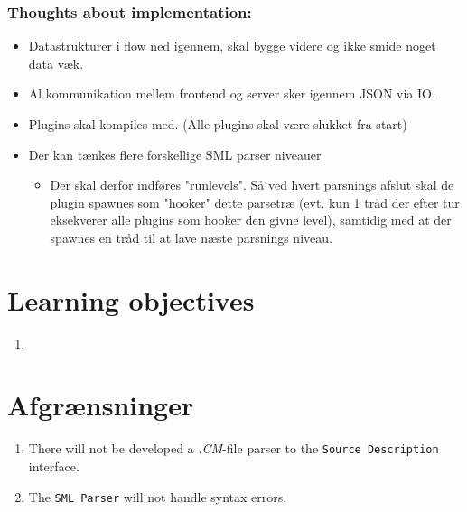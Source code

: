 \documentclass[a4paper,oneside]{memoir}
\begin{document}
\subsubsection{Thoughts about implementation:}
\begin{itemize}
\item Datastrukturer i flow ned igennem, skal bygge videre og ikke smide noget
  data væk.

\item Al kommunikation mellem frontend og server sker igennem JSON via IO.

\item Plugins skal kompiles med. (Alle plugins skal være slukket fra start)


\item Der kan tænkes flere forskellige SML parser niveauer
  \begin{itemize}

  \item Der skal derfor indføres "runlevels". Så ved hvert parsnings
    afslut skal de plugin spawnes som "hooker" dette parsetræ
    (evt. kun 1 tråd der efter tur eksekverer alle plugins som hooker
    den givne level), samtidig med at der spawnes en tråd til at lave
    næste parsnings niveau.
  \end{itemize}
\end{itemize}

\section{Learning objectives}

\begin{enumerate}
\item
\end{enumerate}

\section{Afgrænsninger}

\begin{enumerate}
\item There will not be developed a \textit{.CM}-file parser to the
  \texttt{Source Description} interface.

\item The \texttt{SML Parser} will not handle syntax errors.
\end{enumerate}
\end{document}
